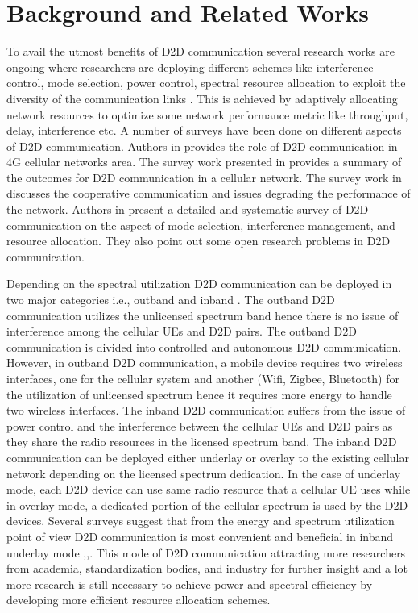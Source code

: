 \documentclass[times]{dacauth}
\begin{document}
\section{Background and Related Works}\label{section:Related Work}

To avail the utmost benefits of D2D communication several research works are ongoing where researchers are deploying different schemes like interference control, mode selection, power control, spectral resource allocation to exploit the diversity of the communication links . This is achieved by adaptively allocating network resources to optimize some network performance metric like throughput, delay, interference etc. A number of surveys have been done on different aspects of D2D communication. Authors in \cite{asadi2014survey} provides the role of D2D communication in 4G cellular networks area. The survey work presented in \cite{liu2015device} provides a summary of the outcomes for D2D communication in a cellular network. The survey work in \cite{alkurd2014survey} discusses the cooperative communication and issues degrading the performance of the network. Authors in \cite{ali2016} present a detailed and systematic survey of D2D communication on the aspect of mode selection, interference management, and resource allocation. They also point out some open research problems in D2D communication.

\noindent
Depending on the spectral utilization D2D communication can be deployed in two major categories i.e., outband and inband \cite{ali2016}. The outband D2D communication utilizes the unlicensed spectrum band hence there is no issue of interference among the cellular UEs and D2D pairs. The outband D2D communication is divided into controlled and autonomous D2D communication. However, in outband D2D communication, a mobile device requires two wireless interfaces, one for the cellular system and another (Wifi, Zigbee, Bluetooth) for the utilization of unlicensed spectrum hence it requires more energy to handle two wireless interfaces. The inband D2D communication suffers from the issue of power control and the interference between the cellular UEs and D2D pairs as they share the radio resources in the licensed spectrum band. The inband D2D communication can be deployed either underlay or overlay to the existing cellular network depending on the licensed spectrum dedication. In the case of underlay mode, each D2D device can use same radio resource that a cellular UE uses while in overlay mode, a dedicated portion of the cellular spectrum is used by the D2D devices. Several surveys suggest that from the energy and spectrum utilization point of view D2D communication is most convenient and beneficial in inband underlay mode \cite{ali2016},\cite{alkurd2014survey},\cite{asadi2014survey}. This mode of D2D communication attracting more researchers from academia, standardization bodies, and industry for further insight and a lot more research is still necessary to achieve power and spectral efficiency by developing more efficient resource allocation schemes. 
\end{document}

